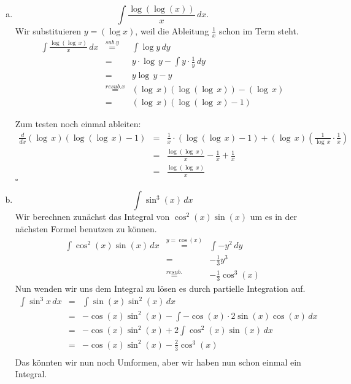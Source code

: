 \documentclass[11pt,a4paper,ngerman]{article}
\begin{document}
\begin{enumerate}[a.]
    
    \item
        $$
            \int \frac{\log ( \log (x))}{x} \, dx.
        $$
        Wir substituieren $y=(\log x)$, weil die Ableitung $\frac{1}{x}$
        schon im Term steht.
        $$\begin{array}{rcl}
            \int \frac{\log ( \log \, x)}{x} \, dx
                &\stackrel{sub. y}{=}& \int \log y \, dy\\
                &=& y \cdot \log \, y - \int y \cdot \frac{1}{y} \, dy\\
                &=& y \log \, y - y\\
                &\stackrel{resub. x}{=}& (\log \, x)(\log (\log \, x)) - (\log \, x)\\
                &=& (\log \, x)(\log(\log \, x) - 1)
        \end{array}$$

        Zum testen noch einmal ableiten:
        $$\begin{array}{rcl}
            \frac{d}{dx} (\log \, x)(\log(\log \, x) - 1)
                &=& \frac{1}{x}\cdot(\log(\log \, x) - 1) + (\log \, x)(\frac{1}{\log \, x} \cdot \frac{1}{x})\\
                &=& \frac{\log(\log \, x)}{x} - \frac{1}{x} + \frac{1}{x}\\
                &=& \frac{\log(\log \, x)}{x}
        \end{array}$$
        \mbox{} \hfill $\square$
    \item
        $$
            \int \sin^3 (x) \, dx
        $$
        Wir berechnen zunächst das Integral von $\cos^2(x)\sin(x)$ um es in der nächsten
        Formel benutzen zu können.
        $$\begin{array}{rcl}
            \int \cos^2(x)\sin(x) \, dx &\stackrel{y=\cos(x)}{=}&
                \int -y^2 \, dy\\
                &=& -\frac{1}{3} y^3\\
                &\stackrel{resub.}{=}& -\frac{1}{3} \cos^3(x)
        \end{array}$$
        Nun wenden wir uns dem Integral zu lösen es durch partielle Integration auf.
        $$\begin{array}{rcl}
            \int \sin^3 x \, dx &=& \int \sin(x) \sin^2(x) \, dx\\
                &=& -\cos(x)\sin^2(x) - \int -\cos(x)\cdot 2 \sin(x) \cos(x) \, dx\\
                &=& - \cos(x)\sin^2(x) + 2 \int \cos^2(x)\sin(x) \, dx \\
                &=& - \cos(x)\sin^2(x) - \frac{2}{3} \cos^3(x)\\
        \end{array}$$
        Das könnten wir nun noch Umformen, aber wir haben nun schon einmal ein Integral.


\end{enumerate}
\end{document}
